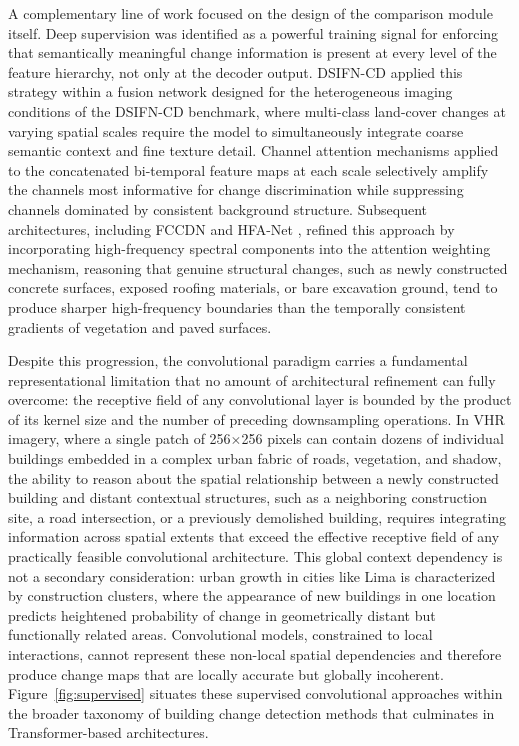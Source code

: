 A complementary line of work focused on the design of the comparison module itself. Deep supervision was identified as a powerful training signal for enforcing that semantically meaningful change information is present at every level of the feature hierarchy, not only at the decoder output. DSIFN-CD \cite{Zhang2020FusionNetDSIFN} applied this strategy within a fusion network designed for the heterogeneous imaging conditions of the DSIFN-CD benchmark, where multi-class land-cover changes at varying spatial scales require the model to simultaneously integrate coarse semantic context and fine texture detail. Channel attention mechanisms applied to the concatenated bi-temporal feature maps at each scale selectively amplify the channels most informative for change discrimination while suppressing channels dominated by consistent background structure. Subsequent architectures, including FCCDN \cite{PChen2022FCCDN} and HFA-Net \cite{Zheng2022HFANet}, refined this approach by incorporating high-frequency spectral components into the attention weighting mechanism, reasoning that genuine structural changes, such as newly constructed concrete surfaces, exposed roofing materials, or bare excavation ground, tend to produce sharper high-frequency boundaries than the temporally consistent gradients of vegetation and paved surfaces.

Despite this progression, the convolutional paradigm carries a fundamental representational limitation that no amount of architectural refinement can fully overcome: the receptive field of any convolutional layer is bounded by the product of its kernel size and the number of preceding downsampling operations. In \ac{VHR} imagery, where a single patch of 256$\times$256 pixels can contain dozens of individual buildings embedded in a complex urban fabric of roads, vegetation, and shadow, the ability to reason about the spatial relationship between a newly constructed building and distant contextual structures, such as a neighboring construction site, a road intersection, or a previously demolished building, requires integrating information across spatial extents that exceed the effective receptive field of any practically feasible convolutional architecture. This global context dependency is not a secondary consideration: urban growth in cities like Lima is characterized by construction clusters, where the appearance of new buildings in one location predicts heightened probability of change in geometrically distant but functionally related areas. Convolutional models, constrained to local interactions, cannot represent these non-local spatial dependencies and therefore produce change maps that are locally accurate but globally incoherent. Figure~\ref{fig:supervised} situates these supervised convolutional approaches within the broader taxonomy of building change detection methods that culminates in Transformer-based architectures.

